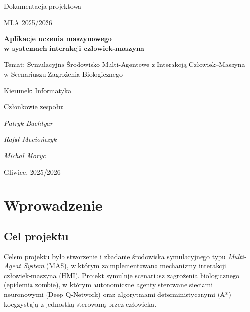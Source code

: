 \documentclass[12pt,a4paper]{article}
\begin{document}
\nocite{*}

\clearpage
\begin{figure}[h]
    \centering
\end{figure}
\hspace{3cm}
\begin{center}\huge Dokumentacja projektowa\end{center}
\begin{center}\large MLA 2025/2026\end{center}
\vspace{1cm}
\hspace{3cm}
\begin{center}\LARGE\textbf{Aplikacje uczenia maszynowego \\w systemach interakcji człowiek-maszyna}\end{center}
\vspace{0.5cm}
\begin{center}\large Temat: Symulacyjne Środowisko Multi-Agentowe z Interakcją Człowiek–Maszyna w Scenariuszu Zagrożenia Biologicznego\end{center}
\hspace{7cm}
\vfill
\begin{flushright}Kierunek: Informatyka
\end{flushright}
\begin{flushright}Członkowie zespołu:
    \par
    \textit{Patryk Buchtyar}
    \par
    \textit{Rafał Maciończyk}
    \par
    \textit{Michał Moryc}
\end{flushright}
\vfill
\begin{center}Gliwice, 2025/2026\end{center}

\newpage
{}
\tableofcontents

\newpage
\section{Wprowadzenie}

\subsection{Cel projektu}
Celem projektu było stworzenie i zbadanie środowiska symulacyjnego typu
\textit{Multi-Agent System} (MAS), w którym zaimplementowano mechanizmy
interakcji człowiek-maszyna (HMI). Projekt symuluje scenariusz zagrożenia
biologicznego (epidemia zombie), w którym autonomiczne agenty sterowane
sieciami neuronowymi (Deep Q-Network) oraz algorytmami deterministycznymi (A*)
koegzystują z jednostką sterowaną przez człowieka.
\end{document}
